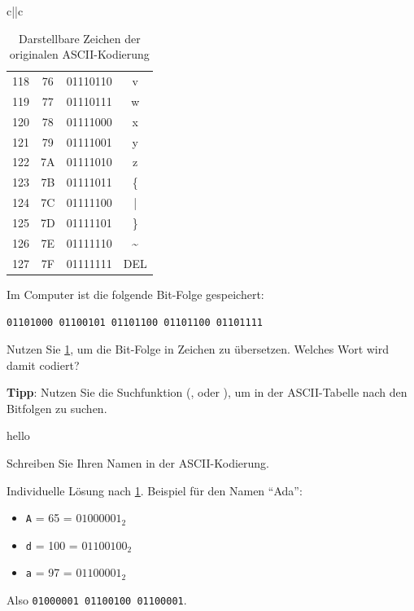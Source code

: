 \begin{table}[H]
{\begin{tabular}{c||c}
\begin{tabular}{cccc}
				118     & 76          & 01110110 & v               \\
				119     & 77          & 01110111 & w               \\
				120     & 78          & 01111000 & x               \\
				121     & 79          & 01111001 & y               \\
				122     & 7A          & 01111010 & z               \\
				123     & 7B          & 01111011 & \{              \\
				124     & 7C          & 01111100 & |               \\
				125     & 7D          & 01111101 & \}              \\
				126     & 7E          & 01111110 & \textasciitilde \\
				127     & 7F          & 01111111 & DEL             \\
			\end{tabular}
		\end{tabular}}
	\caption{Darstellbare Zeichen der originalen \gls{ASCII}-Kodierung}
	\label{table:ascii}
\end{table}
\clearpage

\begin{myexercise}
	Im Computer ist die folgende Bit-Folge gespeichert:

	\texttt{01101000 01100101 01101100 01101100 01101111}

	Nutzen Sie \cref{table:ascii}, um die Bit-Folge in Zeichen zu übersetzen. Welches Wort wird damit codiert?

	\textbf{Tipp}: Nutzen Sie die Suchfunktion (, oder ), um in der \gls{ASCII}-Tabelle nach den Bitfolgen zu suchen.
	\begin{myanswer}
		hello
	\end{myanswer}
\end{myexercise}

\begin{myexercise}\label{myexercise:name-in-ascii}
	Schreiben Sie Ihren Namen in der \gls{ASCII}-Kodierung.
	\begin{myanswer}
		Individuelle Lösung nach \cref{table:ascii}. Beispiel für den Namen \enquote{Ada}:
		\begin{itemize}
			\item \texttt{A} = 65 = $01000001_2$
			\item \texttt{d} = 100 = $01100100_2$
			\item \texttt{a} = 97 = $01100001_2$
		\end{itemize}
		Also \texttt{01000001 01100100 01100001}.
	\end{myanswer}
\end{myexercise}

